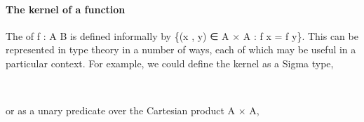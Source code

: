 \paragraph*{The kernel of a function}
The  of \ab f \as : \ab A  \ab B is defined informally by \{(\ab x , \ab y) ∈ \ab A × \ab A : \ab f \ab x = \ab f \ab y\}. This can be represented in type theory in a number of ways, each of which may be useful in a particular context. For example, we could define the kernel as a Sigma type,
\ccpad
\begin{code}%
\>[1]\AgdaSpace{}%
\AgdaSymbol{:}\AgdaSpace{}%
\AgdaSymbol{\{}\AgdaSpace{}%
\AgdaSymbol{:}\AgdaSpace{}%
%
\AgdaSpace{}%
\AgdaSymbol{\}}\AgdaSpace{}%
\AgdaSymbol{\{}\AgdaSpace{}%
\AgdaSymbol{:}\AgdaSpace{}%
%
\AgdaSpace{}%
\AgdaSymbol{\}}\AgdaSpace{}%
\AgdaSpace{}%
\AgdaSymbol{(}\AgdaSpace{}%
\AgdaSpace{}%
\AgdaSymbol{)}\AgdaSpace{}%
\AgdaSpace{}%
\AgdaSpace{}%
\AgdaSpace{}%
%
\<%
\\
%
\>[1]\AgdaSpace{}%
\AgdaSymbol{\{}\AgdaSymbol{\}}\AgdaSpace{}%
\AgdaSpace{}%
\AgdaSymbol{=}\AgdaSpace{}%
\AgdaSpace{}%
\AgdaSpace{}%
\AgdaSpace{}%
\AgdaSpace{}%
\AgdaFunction{,}\AgdaSpace{}%
\AgdaSpace{}%
\AgdaSpace{}%
\AgdaSpace{}%
\AgdaSpace{}%
\AgdaFunction{,}\AgdaSpace{}%
\AgdaSpace{}%
\AgdaSpace{}%
\AgdaSpace{}%
\AgdaSpace{}%
\<%
\end{code}
\ccpad
or as a unary predicate over the Cartesian product \ab A × \ab A,
\ccpad
\begin{code}%
\>[1]\AgdaSpace{}%
\AgdaSymbol{:}\AgdaSpace{}%
\AgdaSymbol{\{}\AgdaSpace{}%
\AgdaSymbol{:}\AgdaSpace{}%
%
\AgdaSymbol{\}\{}\AgdaSpace{}%
\AgdaSymbol{:}\AgdaSpace{}%
%
\AgdaSymbol{\}}\AgdaSpace{}%
\AgdaSpace{}%
\AgdaSymbol{(}\AgdaSpace{}%
\AgdaSpace{}%
\AgdaSymbol{)}\AgdaSpace{}%
\AgdaSpace{}%
\AgdaSpace{}%
\AgdaSymbol{(}\AgdaSpace{}%
\AgdaSpace{}%
\AgdaSymbol{)}\AgdaSpace{}%
\<%
\\
%
\>[1]\AgdaSpace{}%
\AgdaSpace{}%
\AgdaSymbol{(}\AgdaSpace{}%
\AgdaOperator{\AgdaInductiveConstructor{,}}\AgdaSpace{}%
\AgdaSymbol{)}\AgdaSpace{}%
\AgdaSymbol{=}\AgdaSpace{}%
\AgdaSpace{}%
\AgdaSpace{}%
\AgdaSpace{}%
\AgdaSpace{}%
\<%
\end{code}
